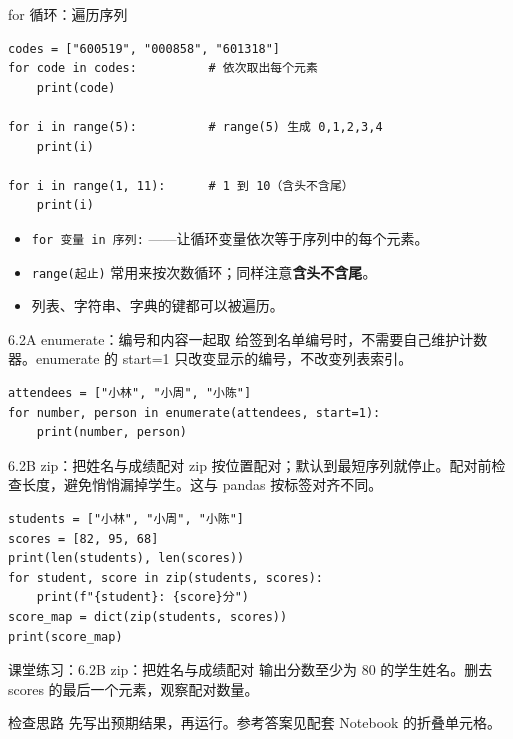 \documentclass[9pt]{ctexbeamer}
\begin{document}
\begin{frame}[fragile]{for 循环：遍历序列}
	\begin{lstlisting}
codes = ["600519", "000858", "601318"]
for code in codes:          # 依次取出每个元素
    print(code)

for i in range(5):          # range(5) 生成 0,1,2,3,4
    print(i)

for i in range(1, 11):      # 1 到 10（含头不含尾）
    print(i)
\end{lstlisting}
	\begin{itemize}
		\item \texttt{for 变量 in 序列:} ——让循环变量依次等于序列中的每个元素。
		\item \texttt{range(起止)} 常用来按次数循环；同样注意\textbf{含头不含尾}。
		\item 列表、字符串、字典的键都可以被遍历。
	\end{itemize}
\end{frame}

\begin{frame}[fragile]{6.2A enumerate：编号和内容一起取}
\small 给签到名单编号时，不需要自己维护计数器。enumerate 的 start=1 只改变显示的编号，不改变列表索引。
\medskip
\begin{lstlisting}
attendees = ["小林", "小周", "小陈"]
for number, person in enumerate(attendees, start=1):
    print(number, person)
\end{lstlisting}
\end{frame}

\begin{frame}[fragile]{6.2B zip：把姓名与成绩配对}
\small zip 按位置配对；默认到最短序列就停止。配对前检查长度，避免悄悄漏掉学生。这与 pandas 按标签对齐不同。
\medskip
\begin{lstlisting}
students = ["小林", "小周", "小陈"]
scores = [82, 95, 68]
print(len(students), len(scores))
for student, score in zip(students, scores):
    print(f"{student}: {score}分")
score_map = dict(zip(students, scores))
print(score_map)
\end{lstlisting}
\end{frame}
\begin{frame}[fragile]{课堂练习：6.2B zip：把姓名与成绩配对}
输出分数至少为 80 的学生姓名。删去 scores 的最后一个元素，观察配对数量。
\medskip
\begin{block}{检查思路}
先写出预期结果，再运行。参考答案见配套 Notebook 的折叠单元格。
\end{block}
\end{frame}
\end{document}
